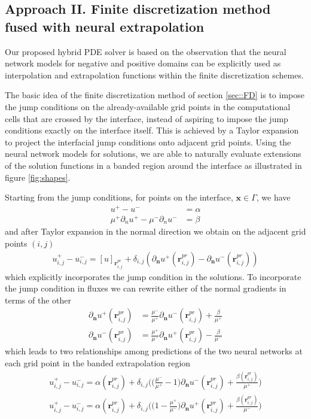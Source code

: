 \documentclass{elsarticle}
\begin{document}
\subsection{Approach II. Finite discretization method fused with neural extrapolation}
Our proposed hybrid PDE solver is based on the observation that the neural network models for negative and positive domains can be explicitly used as interpolation and extrapolation functions within the finite discretization schemes.  

The basic idea of the finite discretization method of section \ref{sec::FD} is to impose the jump conditions on the already-available grid points in the computational cells that are crossed by the interface, instead of aspiring to impose the jump conditions exactly on the interface itself. This is achieved by a Taylor expansion to project the interfacial jump conditions onto adjacent grid points. Using the neural network models for solutions, we are able to naturally evaluate extensions of the solution functions in a banded region around the interface as illustrated in figure \ref{fig:shapes}.


Starting from the jump conditions, for points on the interface, $\mathbf{x}\in \Gamma$, we have
\begin{align*}
u^+ - u^- &= \alpha\\
\mu^+\partial_n u^+ - \mu^- \partial_n u^- &= \beta
\end{align*}
and after Taylor expansion in the normal direction we obtain on the adjacent grid points $(i,j)$
\begin{align}
u^+_{i,j} - u^-_{i,j}=[u]_{\mathbf{r}_{i,j}^{pr}} + \delta_{i,j}(\partial_\mathbf{n}u^+(\mathbf{r}^{pr}_{i,j}) - \partial_\mathbf{n}u^-(\mathbf{r}^{pr}_{i,j})) \label{eq::taylorexpandjump}
\end{align}
which explicitly incorporates the jump condition in the solutions. To incorporate the jump condition in fluxes we can rewrite either of the normal gradients in terms of the other 
\begin{align*}
\partial_\mathbf{n}u^+(\mathbf{r}^{pr}_{i,j}) &= \frac{\mu^-}{\mu^+}\partial_\mathbf{n}u^-(\mathbf{r}^{pr}_{i,j}) + \frac{\beta}{\mu^+}\\
\partial_\mathbf{n}u^-(\mathbf{r}^{pr}_{i,j}) &= \frac{\mu^+}{\mu^-}\partial_\mathbf{n}u^+(\mathbf{r}^{pr}_{i,j}) - \frac{\beta}{\mu^-} 
\end{align*}
which leads to two relationships among predictions of the two neural networks at each grid point in the banded extrapolation region
\begin{align}
u^+_{i,j} - u^-_{i,j}=\alpha(\mathbf{r}_{i,j}^{pr}) + \delta_{i,j}\bigg(\big(\frac{\mu^-}{\mu^+}-1\big)\partial_\mathbf{n}u^-(\mathbf{r}^{pr}_{i,j}) + \frac{\beta(\mathbf{r}_{i,j}^{pr})}{\mu^+} \bigg)  \label{eq::extrapolate1}\\
u^+_{i,j} - u^-_{i,j}=\alpha(\mathbf{r}_{i,j}^{pr}) + \delta_{i,j}\bigg(\big(1-\frac{\mu^+}{\mu^-}\big)\partial_\mathbf{n}u^+(\mathbf{r}^{pr}_{i,j}) + \frac{\beta(\mathbf{r}_{i,j}^{pr})}{\mu^-} \bigg) \label{eq::extrapolate2}
\end{align}
\end{document}
